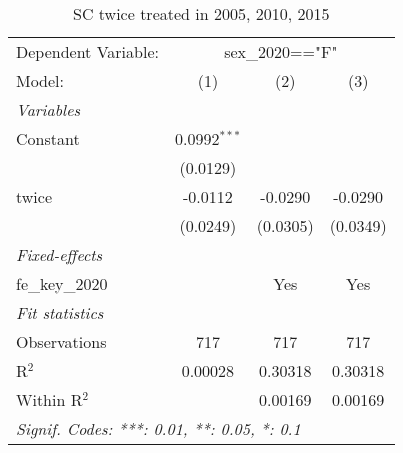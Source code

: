 
\begin{table}[htbp]
   \caption{ SC twice treated in 2005, 2010, 2015}
   \centering
   \begin{tabular}{lccc}
      \tabularnewline \midrule \midrule
      Dependent Variable: & \multicolumn{3}{c}{sex\_2020=="F"}\\
      Model:          & (1)            & (2)      & (3)\\  
      \midrule
      \emph{Variables}\\
      Constant        & 0.0992$^{***}$ &          &   \\   
                      & (0.0129)       &          &   \\   
      twice           & -0.0112        & -0.0290  & -0.0290\\   
                      & (0.0249)       & (0.0305) & (0.0349)\\   
      \midrule
      \emph{Fixed-effects}\\
      fe\_key\_2020   &                & Yes      & Yes\\  
      \midrule
      \emph{Fit statistics}\\
      Observations    & 717            & 717      & 717\\  
      R$^2$           & 0.00028        & 0.30318  & 0.30318\\  
      Within R$^2$    &                & 0.00169  & 0.00169\\  
      \midrule \midrule
      \multicolumn{4}{l}{\emph{Signif. Codes: ***: 0.01, **: 0.05, *: 0.1}}\\
   \end{tabular}
\end{table}


